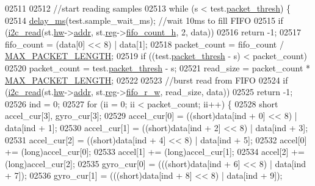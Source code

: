 \begin{DoxyCode}
{{{{{{{{{{{{{{{{{{{{{{{{{{{{02511 
02512     \textcolor{comment}{//start reading samples}
02513     \textcolor{keywordflow}{while} (s < test.\hyperlink{structtest__s_aa8dbf099c1734ea67c1ef1938c0baec8}{packet\_thresh}) \{
02514         \hyperlink{inv__mpu_8c_ae36aca5baf9b6b7d74992aef00686d67}{delay\_ms}(test.sample\_wait\_ms); \textcolor{comment}{//wait 10ms to fill FIFO}
02515         \textcolor{keywordflow}{if} (\hyperlink{_i2_c_8c_ac2d47e7a6c76f93f9b537c31a2986e7b}{i2c\_read}(st.\hyperlink{structgyro__state__s_a5bac30a96752691e4cc723735060e360}{hw}->\hyperlink{structhw__s_a4c34a946600e9d68b6355d23f54d291b}{addr}, st.\hyperlink{structgyro__state__s_ae857e1285c583b7438a208edd691a38e}{reg}->\hyperlink{structgyro__reg__s_a769e352846cc0f576d321f5655f7c11c}{fifo\_count\_h}, 2, data))
02516             \textcolor{keywordflow}{return} -1;
02517         fifo\_count = (data[0] << 8) | data[1];
02518         packet\_count = fifo\_count / \hyperlink{inv__mpu_8c_a973c680573b37fc359fc68d0707da355}{MAX\_PACKET\_LENGTH};
02519         \textcolor{keywordflow}{if} ((test.\hyperlink{structtest__s_aa8dbf099c1734ea67c1ef1938c0baec8}{packet\_thresh} - s) < packet\_count)
02520                     packet\_count = test.\hyperlink{structtest__s_aa8dbf099c1734ea67c1ef1938c0baec8}{packet\_thresh} - s;
02521         read\_size = packet\_count * \hyperlink{inv__mpu_8c_a973c680573b37fc359fc68d0707da355}{MAX\_PACKET\_LENGTH};
02522 
02523         \textcolor{comment}{//burst read from FIFO}
02524         if (\hyperlink{_i2_c_8c_ac2d47e7a6c76f93f9b537c31a2986e7b}{i2c\_read}(st.\hyperlink{structgyro__state__s_a5bac30a96752691e4cc723735060e360}{hw}->\hyperlink{structhw__s_a4c34a946600e9d68b6355d23f54d291b}{addr}, st.\hyperlink{structgyro__state__s_ae857e1285c583b7438a208edd691a38e}{reg}->\hyperlink{structgyro__reg__s_a698342c34cc426e84e3435c6b46da120}{fifo\_r\_w}, read\_size, data))
02525                         \textcolor{keywordflow}{return} -1;
02526         ind = 0;
02527         \textcolor{keywordflow}{for} (ii = 0; ii < packet\_count; ii++) \{
02528             \textcolor{keywordtype}{short} accel\_cur[3], gyro\_cur[3];
02529             accel\_cur[0] = ((short)data[ind + 0] << 8) | data[ind + 1];
02530             accel\_cur[1] = ((short)data[ind + 2] << 8) | data[ind + 3];
02531             accel\_cur[2] = ((short)data[ind + 4] << 8) | data[ind + 5];
02532             accel[0] += (long)accel\_cur[0];
02533             accel[1] += (long)accel\_cur[1];
02534             accel[2] += (long)accel\_cur[2];
02535             gyro\_cur[0] = (((short)data[ind + 6] << 8) | data[ind + 7]);
02536             gyro\_cur[1] = (((short)data[ind + 8] << 8) | data[ind + 9]);
}}}}}}}}}}}}}}}}}}}}}}}}}}}}
\end{DoxyCode}
